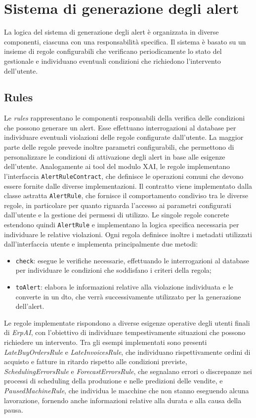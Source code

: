 \section{Sistema di generazione degli alert}
La logica del sistema di generazione degli alert è organizzata in diverse componenti, ciascuna con una responsabilità specifica. Il sistema è basato su un insieme di 
regole configurabili che verificano periodicamente lo stato del gestionale e individuano eventuali condizioni che richiedono l'intervento dell'utente.

\subsection{Rules}
Le \textit{rules} rappresentano le componenti responsabili della verifica delle condizioni che possono generare un alert. Esse effettuano interrogazioni al database per 
individuare eventuali violazioni delle regole configurate dall'utente. La maggior parte delle regole prevede inoltre parametri configurabili, che permettono di personalizzare 
le condizioni di attivazione degli alert in base alle esigenze dell'utente.
\newline
Analogamente ai tool del modulo XAI, le regole implementano l'interfaccia \texttt{AlertRuleContract}, che definisce le operazioni comuni che devono essere fornite dalle diverse 
implementazioni. Il contratto viene implementato dalla classe astratta \texttt{AlertRule}, che fornisce il comportamento condiviso tra le diverse regole, in particolare per 
quanto riguarda l'accesso ai parametri configurati dall'utente e la gestione dei permessi di utilizzo.
\newline
Le singole regole concrete estendono quindi \texttt{AlertRule} e implementano la logica specifica necessaria per individuare le relative violazioni. Ogni regola definisce 
inoltre i metadati utilizzati dall'interfaccia utente e implementa principalmente due metodi:
\begin{itemize}
\item \texttt{check}: esegue le verifiche necessarie, effettuando le interrogazioni al database per individuare le condizioni che soddisfano i criteri della regola;
\item \texttt{toAlert}: elabora le informazioni relative alla violazione individuata e le converte in un \acrfull{dto}, che verrà successivamente utilizzato per la generazione 
  dell'alert.
\end{itemize}
Le regole implementate rispondono a diverse esigenze operative degli utenti finali di \textit{ErpAI}, con l'obiettivo di individuare tempestivamente situazioni 
che possono richiedere un intervento. Tra gli esempi implementati sono presenti \textit{LateBuyOrdersRule} e \textit{LateInvoicesRule}, che individuano rispettivamente 
ordini di acquisto e fatture in ritardo rispetto alle condizioni previste, \textit{SchedulingErrorsRule} e \textit{ForecastErrorsRule}, che segnalano errori o discrepanze nei processi di scheduling della 
produzione e nelle predizioni delle vendite, e \textit{PausedMachineRule}, che individua le macchine che non stanno eseguendo alcuna lavorazione, fornendo anche informazioni relative alla durata e alla causa 
della pausa.

